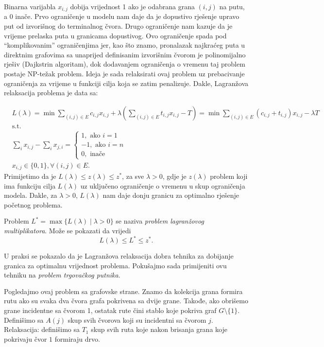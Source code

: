 \documentclass[a4paper, utf8, 11pt, colorlinks]{book}
\begin{document}
Binarna varijabla $x_{i,j}$ dobija vrijednost 1 ako je odabrana grana $(i,j)$ na   putu, a 0 inače.  
Prvo ograničenje u modelu nam daje da je dopustivo rješenje upravo put od izvorišnog do terminalnog čvora. Drugo ograničenje nam kazuje da je vrijeme prelaska puta u granicama dopustivog. Ovo ograničenje spada pod ``komplikovanim'' ograničenjima jer, kao što znamo,  pronalazak najkraćeg puta u direktnim grafovima sa unaprijed definisanim izvorišnim čvorom je polinomijalno rješiv (Dajkstrin algoritam), dok dodavanjem ograničenja o vremenu taj problem postaje NP-težak problem. Ideja je sada relaksirati ovaj problem uz prebacivanje ograničenja za vrijeme u funkciji cilja koja se zatim penalizuje. 
Dakle, Lagranžova relaksacija problema je data sa:

\begin{align*}
       &L(\lambda)= \min\sum_{(i,j) \in E }c_{i,j}x_{i,j}  + \lambda(\sum_{(i,j) \in E} t_{i,j} x_{i,j} - T ) = \min \sum_{(i,j) \in E} (c_{i,j} + t_{i,j} )x_{i,j} - \lambda T \\
        &\mbox{s.t. }\\
    & \sum_{i} x_{i,j} - \sum_{i} x_{j,i} = \begin{cases}  
                                               1, \mbox{ ako } i=1 \\
                                              -1, \mbox{ ako } i=n \\
                                               0, \mbox{ inače }
                                            \end{cases} \\
     & x_{i,j} \in \{0, 1 \}, \forall (i,j) \in E.
\end{align*}
Primijetimo da je $L(\lambda) \leq z(\lambda)  \leq z^*$, za sve $\lambda > 0$, gdje je $z(\lambda)$ problem koji ima funkciju cilja $L(\lambda)$ uz uključeno ograničenje o vremenu u skup ograničenja modela. Dakle, za $\lambda >0$, $L(\lambda)$ nam daje donju granicu za optimalno rješenje početnog problema. 

Problem $L^* = \max \{ L(\lambda) \mid \lambda > 0  \}$ se naziva \emph{problem lagranžovog multiplikatora}. Može se pokazati da vrijedi 
$$ L(\lambda) \leq L^* \leq z^*.$$

U praksi se pokazalo da je Lagranžova relaksacija dobra tehnika za dobijanje granica za optimalnu vrijednost problema. Pokušajmo sada primijeniti ovu tehniku na \emph{problem trgovačkog putnika}.  

Pogledajmo ovaj problem sa grafovske strane. Znamo da kolekcija grana formira rutu ako su svaka dva čvora grafa pokrivena sa dvije grane. Takođe, ako obrišemo grane incidentne sa čvorom 1, ostatak rute čini stablo koje pokriva graf  $G\setminus \{1\}$.  
Definišimo sa $A(j)$ skup svih čvorova koji su incidentni sa čvorom $j$. Relaksacija: definišimo sa $T_1$ skup svih ruta koje nakon brisanja grana koje pokrivaju čvor $1$ formiraju drvo.  
\end{document}
